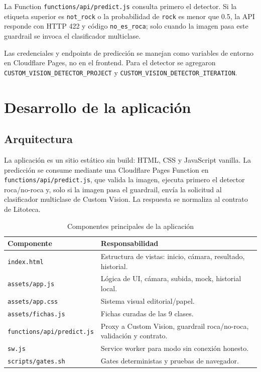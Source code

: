 La Function \texttt{functions/api/predict.js} consulta primero el detector. Si la
etiqueta superior es \texttt{not\_rock} o la probabilidad de \texttt{rock} es menor
que 0.5, la API responde con HTTP 422 y código \texttt{no\_es\_roca}; solo cuando la
imagen pasa este guardrail se invoca el clasificador multiclase.

Las credenciales y endpoints de predicción se manejan como variables de entorno en
Cloudflare Pages, no en el frontend. Para el detector se agregaron
\texttt{CUSTOM\_VISION\_DETECTOR\_PROJECT} y
\texttt{CUSTOM\_VISION\_DETECTOR\_ITERATION}.

\section{Desarrollo de la aplicación}

\subsection{Arquitectura}

La aplicación es un sitio estático sin build: HTML, CSS y JavaScript vanilla. La
predicción se consume mediante una Cloudflare Pages Function en
\texttt{functions/api/predict.js}, que valida la imagen, ejecuta primero el detector
roca/no-roca y, solo si la imagen pasa el guardrail, envía la solicitud al clasificador
multiclase de Custom Vision. La respuesta se normaliza al contrato de Litoteca.

\begin{table}[H]
  \centering
  \caption{Componentes principales de la aplicación}
  \label{tab:componentes}
  \begin{tabular}{@{}p{3.6cm}p{8.8cm}@{}}
    \toprule
    Componente & Responsabilidad \\
    \midrule
    \texttt{index.html} & Estructura de vistas: inicio, cámara, resultado, historial. \\
    \texttt{assets/app.js} & Lógica de UI, cámara, subida, mock, historial local. \\
    \texttt{assets/app.css} & Sistema visual editorial/papel. \\
    \texttt{assets/fichas.js} & Fichas curadas de las 9 clases. \\
    \texttt{functions/api/predict.js} & Proxy a Custom Vision, guardrail roca/no-roca, validación y contrato. \\
    \texttt{sw.js} & Service worker para modo sin conexión honesto. \\
    \texttt{scripts/gates.sh} & Gates deterministas y pruebas de navegador. \\
    \bottomrule
  \end{tabular}
\end{table}

